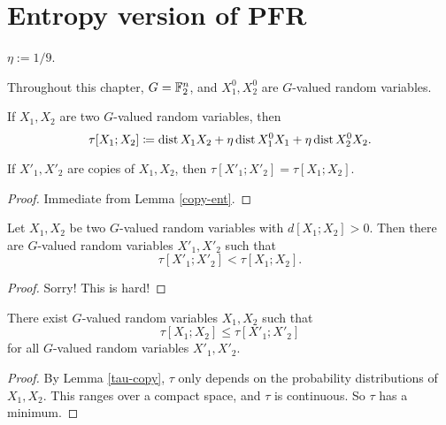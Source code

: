 \chapter{Entropy version of PFR}

\begin{definition}\label{eta-def}
 \leanok
  $\eta := 1/9$.
\end{definition}

Throughout this chapter,  $G = \mathbb{F}_2^n$, and $X^0_1, X^0_2$ are $G$-valued random variables.

\begin{definition}\label{tau-def}
If $X_1,X_2$ are two $G$-valued random variables, then
$$  \tau[X_1; X_2] \coloneqq \operatorname{dist}{X_1}{X_2} + \eta  \operatorname{dist}{X^0_1}{X_1} + \eta \operatorname{dist}{X^0_2}{X_2}.$$
\end{definition}

\begin{lemma}\label{tau-copy}
    If $X'_1, X'_2$ are copies of $X_1,X_2$, then $\tau[X'_1;X'_2] = \tau[X_1;X_2]$.
\end{lemma}


\begin{proof} Immediate from Lemma \ref{copy-ent}.
\end{proof}




\begin{theorem}\label{de-prop}
  Let $X_1, X_2$ be two $G$-valued random variables with $d[X_1;X_2] > 0$. Then there are $G$-valued random variables $X'_1, X'_2$ such that
$$\tau[X'_1;X'_2] < \tau[X_1;X_2].
$$
\end{theorem}

\begin{proof}  Sorry!  This is hard!
\end{proof}


\begin{proposition}\label{tau-min}
  There exist $G$-valued random variables $X_1, X_2$ such that
  $$\tau[X_1;X_2] \leq \tau[X'_1;X'_2]
  $$
for all $G$-valued random variables $X'_1, X'_2$.
\end{proposition}

\begin{proof} By Lemma \ref{tau-copy}, $\tau$ only depends on the probability distributions of $X_1, X_2$. This ranges over a compact space, and $\tau$ is continuous.  So $\tau$ has a minimum.
\end{proof}



